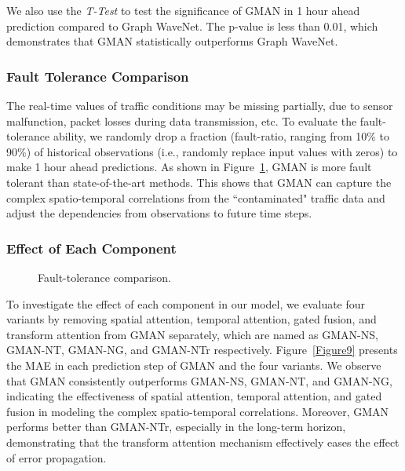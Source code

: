\documentclass[letterpaper]{article} \usepackage{aaai20}  \usepackage{times}  \usepackage{helvet} \usepackage{courier}  \usepackage[hyphens]{url}  \usepackage{graphicx} \usepackage{amsmath}
\begin{document}
We also use the \textit{T-Test} to test the significance of GMAN in 1 hour ahead prediction compared to Graph WaveNet. The p-value is less than 0.01, which demonstrates that GMAN statistically outperforms Graph WaveNet.

\subsubsection{Fault Tolerance Comparison}

The real-time values of traffic conditions may be missing partially, due to sensor malfunction, packet losses during data transmission, etc. To evaluate the fault-tolerance ability, we randomly drop a fraction  (fault-ratio, ranging from 10\% to 90\%) of historical observations (i.e., randomly replace  input values with zeros) to make 1 hour ahead predictions. As shown in Figure~\ref{Figure8}, GMAN is more fault tolerant than state-of-the-art methods. This shows that GMAN can capture the complex spatio-temporal correlations from the ``contaminated" traffic data and adjust the dependencies from observations to future time steps.

\subsubsection{Effect of Each Component}

\begin{figure}
	\centering
	\caption{Fault-tolerance comparison.}
	\label{Figure8} 
\end{figure}

To investigate the effect of each component in our model, we evaluate four variants by removing spatial attention, temporal attention, gated fusion, and transform attention from GMAN separately, which are named as GMAN-NS, GMAN-NT, GMAN-NG, and GMAN-NTr respectively. Figure~\ref{Figure9} presents the MAE in each prediction step of GMAN and the four variants. We observe that GMAN consistently outperforms GMAN-NS, GMAN-NT, and GMAN-NG, indicating the effectiveness of spatial attention, temporal attention, and gated fusion in modeling the complex spatio-temporal correlations. Moreover, GMAN performs better than GMAN-NTr, especially in the long-term horizon, demonstrating that the transform attention mechanism effectively eases the effect of error propagation.
\end{document}
